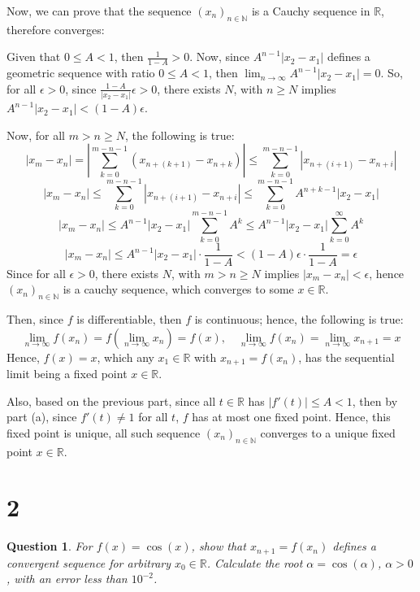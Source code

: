 \documentclass{article}
\newtheorem{question}{Question}
\begin{document}
\begin{itemize}
    \hfil

    Now, we can prove that the sequence $(x_n)_{n\in\mathbb{N}}$ is a Cauchy sequence in $\mathbb{R}$, therefore converges:

    Given that $0\leq A<1$, then $\frac{1}{1-A}>0$. Now, since $A^{n-1}|x_2-x_1|$ defines a geometric sequence with ratio $0\leq A<1$,
    then $\lim_{n\rightarrow\infty}A^{n-1}|x_2-x_1|=0$. So, for all $\epsilon>0$, since $\frac{1-A}{|x_2-x_1|}\epsilon>0$, there exists $N$,
    with $n\geq N$ implies $A^{n-1}|x_2-x_1|<(1-A)\epsilon$.

    Now, for all $m>n\geq N$, the following is true:
    $$|x_m-x_n| = \left|\sum_{k=0}^{m-n-1}(x_{n+(k+1)}-x_{n+k})\right| \leq \sum_{k=0}^{m-n-1}|x_{n+(i+1)}-x_{n+i}|$$
    $$|x_m-x_n|\leq \sum_{k=0}^{m-n-1}|x_{n+(i+1)}-x_{n+i}| \leq \sum_{k=0}^{m-n-1}A^{n+k-1}|x_2-x_1|$$
    $$|x_m-x_n|\leq A^{n-1}|x_2-x_1|\sum_{k=0}^{m-n-1}A^{k} \leq A^{n-1}|x_2-x_1|\sum_{k=0}^{\infty}A^k$$
    $$|x_m-x_n|\leq A^{n-1}|x_2-x_1|\cdot\frac{1}{1-A} < (1-A)\epsilon \cdot \frac{1}{1-A} = \epsilon$$
    Since for all $\epsilon>0$, there exists $N$, with $m>n\geq N$ implies $|x_m-x_n|<\epsilon$, hence $(x_n)_{n\in\mathbb{N}}$ is a cauchy sequence,
    which converges to some $x\in \mathbb{R}$.

    Then, since $f$ is differentiable, then $f$ is continuous; hence, the following is true:
    $$\lim_{n\rightarrow\infty}f(x_n)=f\left(\lim_{n\rightarrow\infty}x_n\right)=f(x),\quad \lim_{n\rightarrow\infty}f(x_n)=\lim_{n\rightarrow\infty}x_{n+1}=x$$
    Hence, $f(x)=x$, which any $x_1\in\mathbb{R}$ with $x_{n+1}=f(x_n)$, has the sequential limit being a fixed point $x\in\mathbb{R}$.

    Also, based on the previous part, since all $t\in\mathbb{R}$ has $|f'(t)|\leq A<1$, then by part (a), since $f'(t)\neq 1$ for all $t$, $f$ has at most one fixed point.
    Hence, this fixed point is unique, all such sequence $(x_n)_{n\in\mathbb{N}}$ converges to a unique fixed point $x\in\mathbb{R}$.
\end{itemize}

\break

\section*{2}
\begin{myBox}[]{}
    \begin{question}
        For $f(x) = \cos(x)$, show that $x_{n+1}=f(x_n)$ defines a convergent sequence
        for arbitrary $x_0\in\mathbb{R}$. Calculate the root $\alpha=\cos(\alpha)$, $\alpha>0$, with an error less than
        $10^{-2}$.
    \end{question}
\end{myBox}
\end{document}
